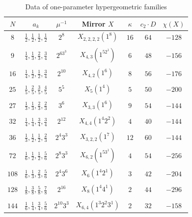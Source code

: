 \documentclass[10pt]{amsart}
\theoremstyle{definition}
\theoremstyle{remark}
\theoremstyle{plain}
\theoremstyle{definition}
\theoremstyle{remark}
\newcommand{\1}{\mathbf{1}}
\newcommand{\2}{\mathbf{2}}
\newcommand{\3}{\mathbf{3}}
\begin{document}
\begin{table}[htpb]
    \centering
    \caption{Data of one-parameter hypergeometric families}
    \label{tab:oneparameter}
    \begin{tabular}{ccccccc}
        \toprule
        $N$ & $a_k$ & $\mu^{-1}$ & Mirror $X$ & $\kappa$ & $c_2 \cdot D$ & $\chi(X)$ \\
        \midrule
        $8$ & $\frac{1}{2},\frac{1}{2},\frac{1}{2},\frac{1}{2}$ & $2^8$ & $X_{2,2,2,2}(1^8)$ & $16$ & $64$ & $-128$ \\
        \\[-0.8em]
        $9$ & $\frac{1}{4},\frac{1}{3},\frac{2}{3},\frac{3}{4}$ & $2^63^3$ & $X_{4,3}(1^52^1)$ & $6$ & $48$ & $-156$ \\
        \\[-0.8em]
        $16$ & $\frac{1}{4},\frac{1}{2},\frac{1}{2},\frac{3}{4}$ & $2^{10}$ & $X_{4,2}(1^6)$ & $8$ & $56$ & $-176$ \\
        \\[-0.8em]
        $25$ & $\frac{1}{5},\frac{2}{5},\frac{3}{5},\frac{4}{5}$ & $5^5$ & $X_{5}(1^4)$ & $5$ & $50$ & $-200$ \\
        \\[-0.8em]
        $27$ & $\frac{1}{3},\frac{1}{3},\frac{2}{3},\frac{2}{3}$ & $3^6$ & $X_{3,3}(1^6)$ & $9$ & $54$ & $-144$ \\
        \\[-0.8em]
        $32$ & $\frac{1}{4},\frac{1}{4},\frac{3}{4},\frac{3}{4}$ & $2^{12}$ & $X_{4,4}(1^4 2^2)$ & $4$ & $40$ & $-144$ \\
        \\[-0.8em]
        $36$ & $\frac{1}{3},\frac{1}{2},\frac{1}{2},\frac{2}{3}$ & $2^4 3^3$ & $X_{3,2,2}(1^7)$ & $12$ & $60$ & $-144$ \\
        \\[-0.8em]
        $72$ & $\frac{1}{6},\frac{1}{2},\frac{1}{2},\frac{5}{6}$ & $2^{8}3^3$ & $X_{6,2}(1^53^1)$ & $4$ & $54$ & $-256$ \\
        \\[-0.8em]
        $108$ & $\frac{1}{6},\frac{1}{3},\frac{2}{3},\frac{5}{6}$ & $2^{4}3^6$ & $X_6(1^4 2^1)$ & $3$ & $42$ & $-204$ \\
        \\[-0.8em]
        $128$ & $\frac{1}{8},\frac{3}{8},\frac{5}{8},\frac{7}{8}$ & $2^{16}$ & $X_{8}(1^4 4^1)$ & $2$ & $44$ & $-296$ \\
        \\[-0.8em]
        $144$ & $\frac{1}{6},\frac{1}{4},\frac{3}{4},\frac{5}{6}$ & $2^{10}3^3$ & $X_{6,4}(1^3 2^2 3^1)$ & $2$ & $32$ & $-158$ \\

\end{tabular}
\end{table}
\end{document}
